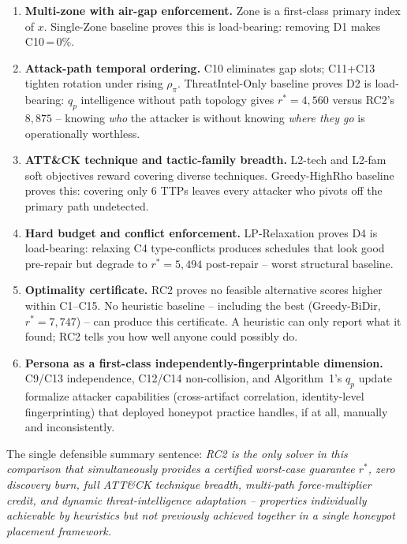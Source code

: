 \documentclass[10pt,twocolumn]{article}
\begin{document}
\begin{enumerate}[leftmargin=1.1em,itemsep=1pt]
\item[\textbf{D1}] \textbf{Multi-zone with air-gap enforcement.} Zone is a first-class primary index of $x$. Single-Zone baseline proves this is load-bearing: removing D1 makes C10\,=\,0\%.
\item[\textbf{D2}] \textbf{Attack-path temporal ordering.} C10 eliminates gap slots; C11+C13 tighten rotation under rising $\rho_\pi$. ThreatIntel-Only baseline proves D2 is load-bearing: $q_p$ intelligence without path topology gives $r^*{=}4{,}560$ versus RC2's $8{,}875$ -- knowing \emph{who} the attacker is without knowing \emph{where they go} is operationally worthless.
\item[\textbf{D3}] \textbf{ATT\&CK technique and tactic-family breadth.} L2-tech and L2-fam soft objectives reward covering diverse techniques. Greedy-HighRho baseline proves this: covering only 6 TTPs leaves every attacker who pivots off the primary path undetected.
\item[\textbf{D4}] \textbf{Hard budget and conflict enforcement.} LP-Relaxation proves D4 is load-bearing: relaxing C4 type-conflicts produces schedules that look good pre-repair but degrade to $r^*{=}5{,}494$ post-repair -- worst structural baseline.
\item[\textbf{D5}] \textbf{Optimality certificate.} RC2 proves no feasible alternative scores higher within C1--C15. No heuristic baseline -- including the best (Greedy-BiDir, $r^*{=}7{,}747$) -- can produce this certificate. A heuristic can only report what it found; RC2 tells you how well anyone could possibly do.
\item[\textbf{D6}] \textbf{Persona as a first-class independently-fingerprintable dimension.} C9/C13 independence, C12/C14 non-collision, and Algorithm~1's $q_p$ update formalize attacker capabilities (cross-artifact correlation, identity-level fingerprinting) that deployed honeypot practice handles, if at all, manually and inconsistently.
\end{enumerate}

\noindent The single defensible summary sentence: \emph{RC2 is the only solver in this comparison that simultaneously provides a certified worst-case guarantee $r^*$, zero discovery burn, full ATT\&CK technique breadth, multi-path force-multiplier credit, and dynamic threat-intelligence adaptation -- properties individually achievable by heuristics but not previously achieved together in a single honeypot placement framework.}
\end{document}
